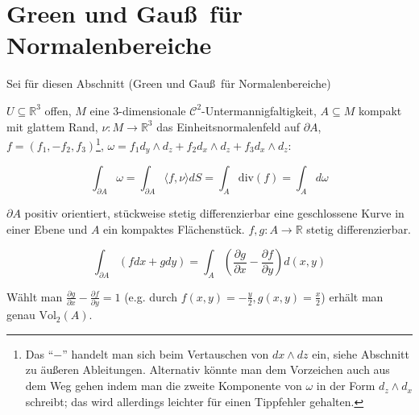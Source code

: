 \section{Green und Gau\ss \, f\"ur Normalenbereiche}
Sei f\"ur diesen Abschnitt (Green und Gau\ss \, f\"ur Normalenbereiche) 


\begin{theorem}[Gau\ss]
	$U\subseteq \mathbb R^3$ offen, $M$ eine $3$-dimensionale $\mathcal C^2$-Untermannigfaltigkeit, $A\subseteq M$ kompakt mit glattem Rand, $\nu:M\rightarrow\mathbb R^3$ das Einheitsnormalenfeld auf $\partial A$, $f=(f_1,-f_2,f_3)$\footnote{Das ``$-$'' handelt man sich beim Vertauschen von $dx\wedge dz$ ein, siehe Abschnitt zu \"au\ss eren Ableitungen. Alternativ k\"onnte man dem Vorzeichen auch aus dem Weg gehen indem man die zweite Komponente von $\omega$ in der Form $d_z\wedge d_x$ schreibt; das wird allerdings leichter f\"ur einen Tippfehler gehalten.}, $\omega = f_1 d_y\wedge d_z+f_2 d_x\wedge d_z+ f_3 d_x\wedge d_z$:
	
	$$\int_{\partial A}\omega = \boxed{\int_{\partial A}\langle f,\nu \rangle dS = \int_A \text{div}(f)} = \int_A d\omega$$
\end{theorem}

\begin{theorem}[Green]
	$\partial A$ positiv orientiert, st\"uckweise stetig differenzierbar eine geschlossene Kurve in einer Ebene und $A$ ein kompaktes Fl\"achenst\"uck. $f,g:A\rightarrow\mathbb R$ stetig differenzierbar.
	
	$$\int_{\partial A} (fdx+gdy) = \int_A \left(\frac{\partial g}{\partial x} - \frac{\partial f}{\partial y}\right)d(x,y)$$
\end{theorem}
\begin{remark}[Spezialfall]
	W\"ahlt man $\frac{\partial g}{\partial x} - \frac{\partial f}{\partial y}=1$ (e.g. durch $f(x,y)=-\frac{y}{2}, g(x,y)=\frac{x}{2}$) erh\"alt man genau $\text{Vol}_2(A)$.
\end{remark}





